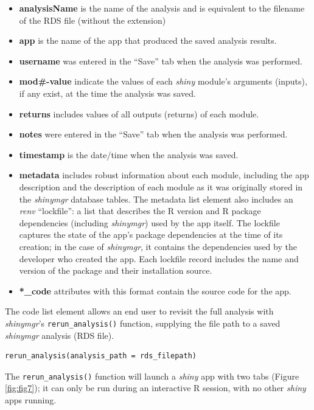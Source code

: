 \begin{itemize}
\tightlist
\item
  \textbf{analysisName} is the name of the analysis and is equivalent to the filename of the RDS file (without the extension)
\item
  \textbf{app} is the name of the app that produced the saved analysis results.
\item
  \textbf{username} was entered in the ``Save'' tab when the analysis was performed.
\item
  \textbf{mod\#-value} indicate the values of each \emph{shiny} module's arguments (inputs), if any exist, at the time the analysis was saved.
\item
  \textbf{returns} includes values of all outputs (returns) of each module.
\item
  \textbf{notes} were entered in the ``Save'' tab when the analysis was performed.
\item
  \textbf{timestamp} is the date/time when the analysis was saved.
\item
  \textbf{metadata} includes robust information about each module, including the app description and the description of each module as it was originally stored in the \emph{shinymgr} database tables. The metadata list element also includes an \emph{renv} ``lockfile'': a list that describes the R version and R package dependencies (including \emph{shinymgr}) used by the app itself. The lockfile captures the state of the app's package dependencies at the time of its creation; in the case of \emph{shinymgr}, it contains the dependencies used by the developer who created the app. Each lockfile record includes the name and version of the package and their installation source.
\item
  \textbf{*\_code} attributes with this format contain the source code for the app.
\end{itemize}

The code list element allows an end user to revisit the full analysis with \emph{shinymgr}'s \texttt{rerun\_analysis()} function, supplying the file path to a saved \emph{shinymgr} analysis (RDS file).

\begin{verbatim}
rerun_analysis(analysis_path = rds_filepath)
\end{verbatim}

The \texttt{rerun\_analysis()} function will launch a \emph{shiny} app with two tabs (Figure \ref{fig:fig7}); it can only be run during an interactive R session, with no other \emph{shiny} apps running.

